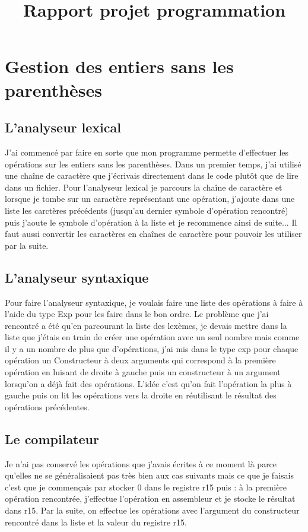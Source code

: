 \documentclass{article}
\title{Rapport projet programmation}
\author{}
\date{}
\begin{document}
\maketitle
\section{Gestion des entiers sans les parenthèses}

\subsection{L'analyseur lexical}
J'ai commencé par faire en sorte que mon programme permette d'effectuer les opérations sur les entiers sans les parenthèses. Dans un premier temps, j'ai utilisé une chaîne de caractère que j'écrivais directement dans le code plutôt que de lire dans un fichier. Pour l'analyseur lexical je parcours la chaîne de caractère et lorsque je tombe sur un caractère représentant une opération, j'ajoute dans une liste les carctères précédents (jusqu'au dernier symbole d'opération rencontré) puis j'aoute le symbole d'opération à la liste et je recommence ainsi de suite... Il faut aussi convertir les caractères en chaînes de caractère pour pouvoir les utiliser par la suite. 

\subsection{L'analyseur syntaxique}
Pour faire l'analyseur syntaxique, je voulais faire une liste des opérations à faire à l'aide du type Exp pour les faire dans le bon ordre. Le problème que j'ai rencontré a été qu'en parcourant la liste des lexèmes, je devais mettre dans la liste que j'étais en train de créer une opération avec un seul nombre mais comme il y a un nombre de plus que d'opérations, j'ai mis dans le type exp pour chaque opération un Constructeur à deux arguments qui correspond à la première opération en luisant de droite à gauche puis un constructeur à un argument lorsqu'on a déjà fait des opérations. L'idée c'est qu'on fait l'opération la plus à gauche puis on lit les opérations vers la droite en réutilisant le résultat des opérations précédentes.

\subsection{Le compilateur}
Je n'ai pas conservé les opérations que j'avais écrites à ce moment là parce qu'elles ne se généralisaient pas très bien aux cas suivants mais ce que je faisais c'est que je commençais par stocker 0 dans le registre r15 puis : à la première opération rencontrée, j'effectue l'opération en assembleur et je stocke le résultat dans r15. Par la suite, on effectue les opérations avec l'argument du constructeur rencontré dans la liste et la valeur du registre r15.
\end{document}
